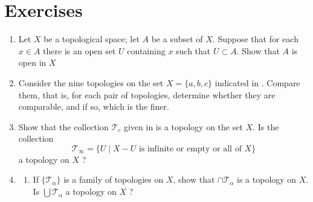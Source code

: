 \section*{Exercises}
\begin{enumerate}[itemsep=0.4em, parsep=0pt, topsep=0pt, partopsep=0pt, leftmargin=*, label=\arabic*., ref=\arabic*]
\item Let \(X\) be a topological space; let \(A\) be a subset of \(X\). Suppose that for each \(x \in A\) there is an open set \(U\) containing \(x\) such that \(U \subset A\). Show that \(A\) is open in \(X\)
\item Consider the nine topologies on the set \(X = \{ a,b,c\}\) indicated in . Compare them, that is, for each pair of topologies, determine whether they are comparable, and if so, which is the finer.
\item Show that the collection \(\mathcal{T}_{c}\) given in  is a topology on the set \(X\). Is the collection \[ \mathcal{T}_{\infty } = \{ U \mid X - U\text{ is infinite or empty or all of }X\} \] a topology on \(X\) ?
\item
  \begin{enumerate}[itemsep=0.2em, parsep=0pt, topsep=0pt, partopsep=0pt, leftmargin=*, label=(\alph*), align=left]
  \item If \(\{ \mathcal{T}_{\alpha }\}\) is a family of topologies on \(X\), show that \(\cap {\mathcal{T}}_{\alpha }\) is a topology on \(X\). Is \(\bigcup {\mathcal{T}}_{\alpha }\) a topology on \(X\) ?


\end{enumerate}
\end{enumerate}
